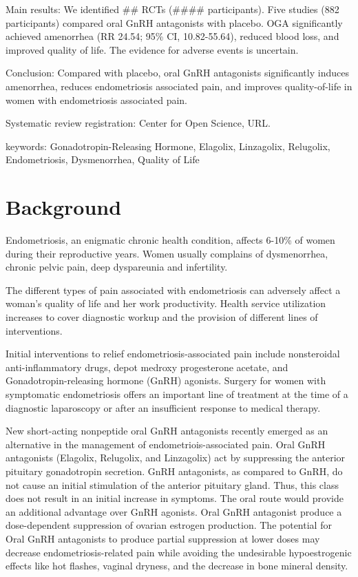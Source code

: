 \documentclass[
  letterpaper,
  DIV=11,
  numbers=noendperiod]{scrartcl}
\begin{document}
Main results: We identified \#\# RCTs (\#\#\#\# participants). Five
studies (882 participants) compared oral GnRH antagonists with placebo.
OGA significantly achieved amenorrhea (RR 24.54; 95\% CI, 10.82-55.64),
reduced blood loss, and improved quality of life. The evidence for
adverse events is uncertain.

Conclusion: Compared with placebo, oral GnRH antagonists significantly
induces amenorrhea, reduces endometriosis associated pain, and improves
quality-of-life in women with endometriosis associated pain.

Systematic review registration: Center for Open Science, URL.

keywords: Gonadotropin-Releasing Hormone, Elagolix, Linzagolix,
Relugolix, Endometriosis, Dysmenorrhea, Quality of Life

\section{Background}\label{background}

Endometriosis, an enigmatic chronic health condition, affects 6-10\% of
women during their reproductive years. Women usually complains of
dysmenorrhea, chronic pelvic pain, deep dyspareunia and infertility.

The different types of pain associated with endometriosis can adversely
affect a woman's quality of life and her work productivity. Health
service utilization increases to cover diagnostic workup and the
provision of different lines of interventions.

Initial interventions to relief endometriosis-associated pain include
nonsteroidal anti-inflammatory drugs, depot medroxy progesterone
acetate, and Gonadotropin-releasing hormone (GnRH) agonists. Surgery for
women with symptomatic endometriosis offers an important line of
treatment at the time of a diagnostic laparoscopy or after an
insufficient response to medical therapy.

New short-acting nonpeptide oral GnRH antagonists recently emerged as an
alternative in the management of endometriois-associated pain. Oral GnRH
antagonists (Elagolix, Relugolix, and Linzagolix) act by suppressing the
anterior pituitary gonadotropin secretion. GnRH antagonists, as compared
to GnRH, do not cause an initial stimulation of the anterior pituitary
gland. Thus, this class does not result in an initial increase in
symptoms. The oral route would provide an additional advantage over GnRH
agonists. Oral GnRH antagonist produce a dose-dependent suppression of
ovarian estrogen production. The potential for Oral GnRH antagonists to
produce partial suppression at lower doses may decrease
endometriosis-related pain while avoiding the undesirable hypoestrogenic
effects like hot flashes, vaginal dryness, and the decrease in bone
mineral density.
\end{document}
